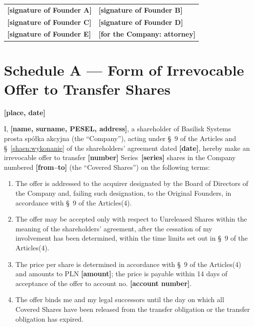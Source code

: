 \documentclass[12pt,a4paper]{report}
\newcommand{\field}[1]{\textbf{[#1]}}
\newcommand{\CompanyFull}{Basilisk Systems prosta spółka akcyjna}
\newcommand{\USen}[1]{\S~#1 of the Articles}
\begin{document}
\vspace{1cm}
\begin{center}
\begin{tabularx}{\textwidth}{XX}
\field{signature of Founder A} & \field{signature of Founder B} \\[1.2cm]
\field{signature of Founder C} & \field{signature of Founder D} \\[1.2cm]
\field{signature of Founder E} & \field{for the Company: attorney} \\
\end{tabularx}
\end{center}

\newpage
\section*{Schedule A --- Form of Irrevocable Offer to Transfer Shares}

\field{place, date}

I, \field{name, surname, PESEL, address}, a shareholder of \CompanyFull{} (the ``Company''), acting under \USen{9} and \S~\ref{shaen:wykonanie} of the shareholders' agreement dated \field{date}, hereby make an irrevocable offer to transfer \field{number} Series~\field{series} shares in the Company numbered \field{from--to} (the ``Covered Shares'') on the following terms:

\begin{enumerate}
  \item The offer is addressed to the acquirer designated by the Board of Directors of the Company and, failing such designation, to the Original Founders, in accordance with \USen{9}(4).
  \item The offer may be accepted only with respect to Unreleased Shares within the meaning of the shareholders' agreement, after the cessation of my involvement has been determined, within the time limits set out in \USen{9}(4).
  \item The price per share is determined in accordance with \USen{9}(4) and amounts to PLN \field{amount}; the price is payable within 14 days of acceptance of the offer to account no. \field{account number}.
  \item The offer binds me and my legal successors until the day on which all Covered Shares have been released from the transfer obligation or the transfer obligation has expired.
\end{enumerate}
\end{document}
